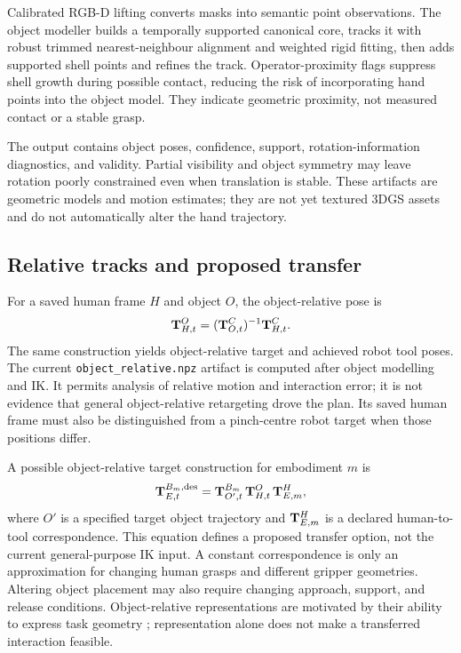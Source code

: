 Calibrated RGB-D lifting converts masks into semantic point observations.
The object modeller builds a temporally supported canonical core, tracks
it with robust trimmed nearest-neighbour alignment and weighted rigid
fitting, then adds supported shell points and refines the track.
Operator-proximity flags suppress shell growth during possible contact,
reducing the risk of incorporating hand points into the object model.
They indicate geometric proximity, not measured contact or a stable grasp.

The output contains object poses, confidence, support, rotation-information
diagnostics, and validity. Partial visibility and object symmetry may leave
rotation poorly constrained even when translation is stable. These
artifacts are geometric models and motion estimates; they are not yet
textured 3DGS assets and do not automatically alter the hand trajectory.

\subsection{Relative tracks and proposed transfer}

For a saved human frame $H$ and object $O$, the object-relative pose is
\begin{equation}
  \mathbf{T}^O_{H,t}=(\mathbf{T}^C_{O,t})^{-1}\mathbf{T}^C_{H,t}.
  \label{eq:objrel}
\end{equation}
The same construction yields object-relative target and achieved robot
tool poses. The current \texttt{object\_relative.npz} artifact is computed
after object modelling and IK. It permits analysis of relative motion and
interaction error; it is not evidence that general object-relative
retargeting drove the plan. Its saved human frame must also be distinguished
from a pinch-centre robot target when those positions differ.

A possible object-relative target construction for embodiment $m$ is
\begin{equation}
  \mathbf{T}^{B_m,\mathrm{des}}_{E,t}
    =\mathbf{T}^{B_m}_{O',t}\,\mathbf{T}^O_{H,t}\,\mathbf{T}^H_{E,m},
  \label{eq:transfer}
\end{equation}
where $O'$ is a specified target object trajectory and $\mathbf{T}^H_{E,m}$ is a
declared human-to-tool correspondence. This equation defines a proposed
transfer option, not the current general-purpose IK input. A constant
correspondence is only an approximation for changing human grasps and
different gripper geometries. Altering object placement may also require
changing approach, support, and release conditions. Object-relative
representations are motivated by their ability to express task geometry
\cite{orion,spot}; representation alone does not make a transferred
interaction feasible.

